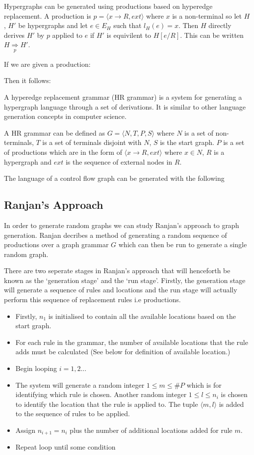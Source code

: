 \documentclass{article}
\begin{document}
    Hypergraphs can be generated using productions based on hyperedge replacement. A production is $p = \langle x \to R, ext \rangle$ where $x$ is a non-terminal so let $H$, $H'$ be hypergraphs and let $e \in E_H$ such that $l_{H}(e) = x$. Then $H$ directly derives $H'$ by $p$ applied to $e$ if $H'$ is equivilent to $H[e / R]$. This can be written $H \underset{p}{\Rightarrow} H'$.

    If we are given a production:
    

    Then it follows:
    

    A hyperedge replacement grammar (HR grammar) is a system for generating a hypergraph language through a set of derivations. It is similar to other language generation concepts in computer science.

    A HR grammar can be defined as $G = \langle N, T, P, S \rangle$ where $N$ is a set of non-terminals, $T$ is a set of terminals disjoint with $N$, $S$ is the start graph. $P$ is a set of productions which are in the form of $\langle x \to R, ext \rangle$ where $x \in N$, $R$ is a hypergraph and $ext$ is the sequence of external nodes in $R$.

    The language of a control flow graph can be generated with the following
    

\subsection{Ranjan's Approach}
  In order to generate random graphs we can study Ranjan's approach to graph generation. Ranjan\cite{Ranjan} decribes a method of generating a random sequence of productions over a graph grammar $G$ which can then be run to generate a single random graph.

  There are two seperate stages in Ranjan's approach that will henceforth be known as the `generation stage' and the `run stage'. Firstly, the generation stage will generate a sequence of rules and locations and the run stage will actually perform this sequence of replacement rules i.e productions.

  \begin{itemize}
  \item Firstly, $n_1$ is initialised to contain all the available locations based on the start graph.
  \item For each rule in the grammar, the number of available locations that the rule adds must be calculated (See below for definition of available location.)
  \item Begin looping $i = 1,2...$
  \item The system will generate a random integer $1 \leq m \leq \#P$ which is for identifying which rule is chosen. Another random integer $1 \leq l \leq n_i$ is chosen to identify the location that the rule is applied to. The tuple $\langle m,l \rangle$ is added to the sequence of rules to be applied.
  \item Assign $n_{i+1} = n_i$ plus the number of additional locations added for rule $m$. 
  \item Repeat loop until some condition
  \end{itemize}
\end{document}
